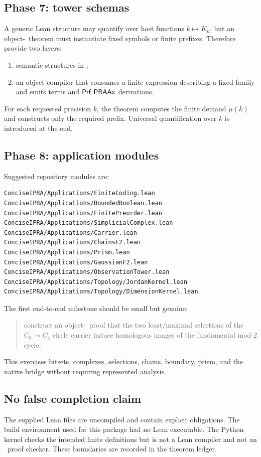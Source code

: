 \subsection{Phase 7: tower schemas}

A generic Lean structure may quantify over host functions $k\mapsto K_k$, but an object-\ipra\ theorem must instantiate fixed symbols or finite prefixes.  Therefore provide two layers:
\begin{enumerate}
  \item semantic structures in ;
  \item an object compiler that consumes a finite expression describing a fixed family and emits  terms and $\Prf\ \PRAAx$ derivations.
\end{enumerate}

For each requested precision $k$, the theorem computes the finite demand $\mu(k)$ and constructs only the required prefix.  Universal quantification over $k$ is introduced at the end.

\subsection{Phase 8: application modules}

Suggested repository modules are:
\begin{lstlisting}[language={},caption={Proposed module layout}]
ConciseIPRA/Applications/FiniteCoding.lean
ConciseIPRA/Applications/BoundedBoolean.lean
ConciseIPRA/Applications/FinitePreorder.lean
ConciseIPRA/Applications/SimplicialComplex.lean
ConciseIPRA/Applications/Carrier.lean
ConciseIPRA/Applications/ChainsF2.lean
ConciseIPRA/Applications/Prism.lean
ConciseIPRA/Applications/GaussianF2.lean
ConciseIPRA/Applications/ObservationTower.lean
ConciseIPRA/Applications/Topology/JordanKernel.lean
ConciseIPRA/Applications/Topology/DimensionKernel.lean
\end{lstlisting}

The first end-to-end milestone should be small but genuine:
\begin{quote}
construct an object-\ipra\ proof that the two least/maximal selections of the $C_8\multimap C_4$ circle carrier induce homologous images of the fundamental mod-$2$ cycle.
\end{quote}
This exercises bitsets, complexes, selections, chains, boundary, prism, and the native bridge without requiring represented analysis.

\subsection{No false completion claim}

The supplied Lean files are uncompiled and contain explicit  obligations.  The build environment used for this package had no Lean executable.  The Python kernel checks the intended finite definitions but is not a Lean compiler and not an \ipra\ proof checker.  These boundaries are recorded in the theorem ledger.
